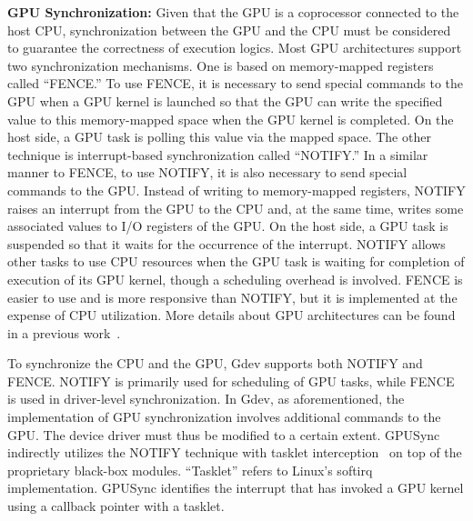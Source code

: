 \textbf{GPU Synchronization:}
 Given that the GPU is a coprocessor connected to the host CPU, synchronization between the GPU and the CPU must be considered to guarantee the correctness of execution logics.
Most GPU architectures support two synchronization mechanisms.
One is based on memory-mapped registers called ``FENCE.''
To use FENCE, it is necessary to send special commands to the GPU when a GPU kernel is launched so that the GPU can write the specified value to this memory-mapped space when the GPU kernel is completed.
On the host side, a GPU task is polling this value via the mapped space.
The other technique is interrupt-based synchronization called ``NOTIFY.''
In a similar manner to FENCE, to use NOTIFY, it is also necessary to send special commands to the GPU.
Instead of writing to memory-mapped registers, NOTIFY raises an interrupt from the GPU to the CPU and, at the same time, writes some associated values to I/O registers of the GPU.
On the host side, a GPU task is suspended so that it waits for the occurrence of the interrupt.
NOTIFY allows other tasks to use CPU resources when the GPU task is waiting for completion of execution of its GPU kernel, though a scheduling overhead is involved.
FENCE is easier to use and is more responsive than NOTIFY, but it is implemented at the expense of CPU utilization.
More details about GPU architectures can be found in a previous work~\cite{kato:timegraph, kato:gdev, fujii:apsys2013}.

To synchronize the CPU and the GPU, Gdev supports both NOTIFY and FENCE.
NOTIFY is primarily used for scheduling of GPU tasks, while FENCE is used in driver-level synchronization.
In Gdev, as aforementioned, the implementation of GPU synchronization involves additional commands to the GPU.
The device driver must thus be modified to a certain extent.
GPUSync indirectly utilizes the NOTIFY technique with tasklet interception~\cite{elliott2012robust} on top of the proprietary black-box modules.
``Tasklet'' refers to Linux's softirq implementation.
GPUSync identifies the interrupt that has invoked a GPU kernel using a callback pointer with a tasklet.

